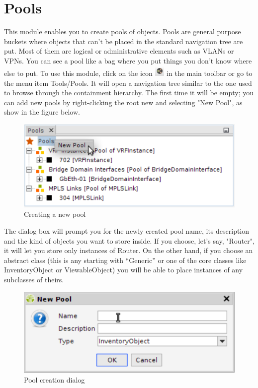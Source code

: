 \documentclass[a4paper]{article}
\begin{document}
	\section{Pools} \label{sec:pools_manager}
	This module enables you to create pools of objects. Pools are general purpose buckets where objects that can't be placed in the standard navigation tree are put. Most of them are logical or administrative elements such as VLANs or VPNs. You can see a pool like a bag where you put things you don't know where else to put. To use this module, click on the icon  \includegraphics[width=0.5cm]{img/icon_pools_manager.png} in the main toolbar or go to the menu item Tools/Pools. It will open a navigation tree similar to the one used to browse through the containment hierarchy. The first time it will be empty; you can add new pools by right-clicking the root new and selecting "New Pool", as show in the figure below.
	\begin{figure}[h!]
		\centering
		\includegraphics[width=0.5\linewidth]{img/pools_actions.png}
		\caption{Creating a new pool}
		\label{fig:pools_actions}
	\end{figure}
	
	The dialog box will prompt you for the newly created pool name, its description and the kind of objects  you want to store inside. If you choose, let's say, "Router", it will let you store only instances of Router. On the other hand, if you choose an abstract class (this is any starting with “Generic” or one of the core classes like InventoryObject or ViewableObject) you will be able to place instances of any subclasses of theirs. 
	\begin{figure}[h!]
		\centering
		\includegraphics[width=0.5\linewidth]{img/pools_create_new_pool.png}
		\caption{Pool creation dialog}
		\label{fig:pools_create_new_pool}
	\end{figure}
	
\end{document}
